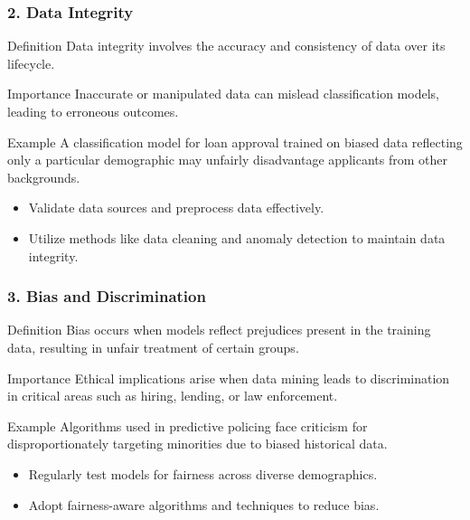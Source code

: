 \documentclass[aspectratio=169]{beamer}
\begin{document}
\begin{frame}[fragile]
    \frametitle{2. Data Integrity}
    \begin{block}{Definition}
        Data integrity involves the accuracy and consistency of data over its lifecycle.
    \end{block}
    \begin{block}{Importance}
        Inaccurate or manipulated data can mislead classification models, leading to erroneous outcomes.
    \end{block}
    \begin{block}{Example}
        A classification model for loan approval trained on biased data reflecting only a particular demographic may unfairly disadvantage applicants from other backgrounds.
    \end{block}
    \begin{itemize}
        \item Validate data sources and preprocess data effectively.
        \item Utilize methods like data cleaning and anomaly detection to maintain data integrity.
    \end{itemize}
\end{frame}

\begin{frame}[fragile]
    \frametitle{3. Bias and Discrimination}
    \begin{block}{Definition}
        Bias occurs when models reflect prejudices present in the training data, resulting in unfair treatment of certain groups.
    \end{block}
    \begin{block}{Importance}
        Ethical implications arise when data mining leads to discrimination in critical areas such as hiring, lending, or law enforcement.
    \end{block}
    \begin{block}{Example}
        Algorithms used in predictive policing face criticism for disproportionately targeting minorities due to biased historical data.
    \end{block}
    \begin{itemize}
        \item Regularly test models for fairness across diverse demographics.
        \item Adopt fairness-aware algorithms and techniques to reduce bias.
    \end{itemize}
\end{frame}
\end{document}
